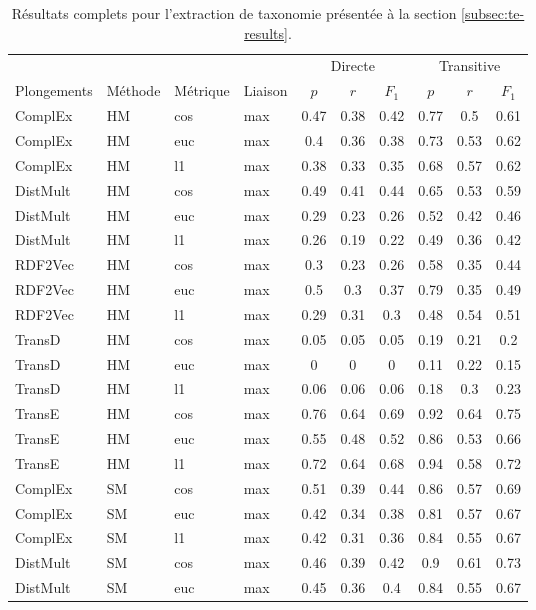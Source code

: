 \begin{longtable}{|llll|ccc|ccc|}
    \caption{Résultats complets pour l'extraction de taxonomie présentée à la section \ref{subsec:te-results}.}
    \label{tab:te-full-results}
    \hline 
	&		&		&		&	\multicolumn{3}{c|}{Directe} & \multicolumn{3}{c|}{Transitive}   \\
Plongements	&	Méthode	&	Métrique	&	Liaison	&	$p$	&	$r$	&	$F_1$	&	$p$	&	$r$	&	$F_1$	\\
\hline \endhead
\hline \endfoot
ComplEx	&	HM	&	cos	&	max	&	0.47	&	0.38	&	0.42	&	0.77	&	0.5	&	0.61 \\ 
ComplEx	&	HM	&	euc	&	max	&	0.4	&	0.36	&	0.38	&	0.73	&	0.53	&	0.62 \\ 
ComplEx	&	HM	&	l1	&	max	&	0.38	&	0.33	&	0.35	&	0.68	&	0.57	&	0.62 \\ 
DistMult	&	HM	&	cos	&	max	&	0.49	&	0.41	&	0.44	&	0.65	&	0.53	&	0.59 \\ 
DistMult	&	HM	&	euc	&	max	&	0.29	&	0.23	&	0.26	&	0.52	&	0.42	&	0.46 \\ 
DistMult	&	HM	&	l1	&	max	&	0.26	&	0.19	&	0.22	&	0.49	&	0.36	&	0.42 \\ 
RDF2Vec	&	HM	&	cos	&	max	&	0.3	&	0.23	&	0.26	&	0.58	&	0.35	&	0.44 \\ 
RDF2Vec	&	HM	&	euc	&	max	&	0.5	&	0.3	&	0.37	&	0.79	&	0.35	&	0.49 \\ 
RDF2Vec	&	HM	&	l1	&	max	&	0.29	&	0.31	&	0.3	&	0.48	&	0.54	&	0.51 \\ 
TransD	&	HM	&	cos	&	max	&	0.05	&	0.05	&	0.05	&	0.19	&	0.21	&	0.2 \\ 
TransD	&	HM	&	euc	&	max	&	0	&	0	&	0	&	0.11	&	0.22	&	0.15 \\ 
TransD	&	HM	&	l1	&	max	&	0.06	&	0.06	&	0.06	&	0.18	&	0.3	&	0.23 \\ 
TransE	&	HM	&	cos	&	max	&	0.76	&	0.64	&	0.69	&	0.92	&	0.64	&	0.75 \\ 
TransE	&	HM	&	euc	&	max	&	0.55	&	0.48	&	0.52	&	0.86	&	0.53	&	0.66 \\ 
TransE	&	HM	&	l1	&	max	&	0.72	&	0.64	&	0.68	&	0.94	&	0.58	&	0.72 \\ 
ComplEx	&	SM	&	cos	&	max	&	0.51	&	0.39	&	0.44	&	0.86	&	0.57	&	0.69 \\ 
ComplEx	&	SM	&	euc	&	max	&	0.42	&	0.34	&	0.38	&	0.81	&	0.57	&	0.67 \\ 
ComplEx	&	SM	&	l1	&	max	&	0.42	&	0.31	&	0.36	&	0.84	&	0.55	&	0.67 \\ 
DistMult	&	SM	&	cos	&	max	&	0.46	&	0.39	&	0.42	&	0.9	&	0.61	&	0.73 \\ 
DistMult	&	SM	&	euc	&	max	&	0.45	&	0.36	&	0.4	&	0.84	&	0.55	&	0.67 \\ 

\end{longtable}

